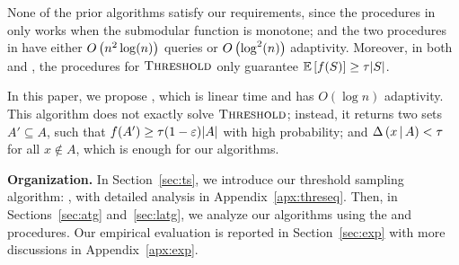 None of the prior algorithms satisfy our
requirements, since
the procedures in  only works when
the submodular function is monotone;
and the two procedures in 
have either $O\left( n^2 \log(n) \right)$ queries or $O\left( \log^2(n) \right)$ adaptivity.
Moreover, in both 
and , the
procedures for $\textsc{Threshold}$ only guarantee
$\mathbb{E} \left[  f(S)  \right] \ge \tau |S|$.

In this paper, we propose 
\threseq, which is linear time and has $O( \log n )$
adaptivity.
This algorithm does not exactly solve $\textsc{Threshold}$; instead,
it returns two sets $A' \subseteq A$, such that
$f(A') \ge \tau(1 - \varepsilon) |A|$ with high probability; 
and $\Delta \left( x \, | \, A \right) < \tau$
for all $x \not \in A$,
which is enough for our algorithms.

\textbf{Organization.}
In Section~\ref{sec:ts}, we introduce our threshold sampling
algorithm: \threseq, with detailed analysis in Appendix~\ref{apx:threseq}.
Then, in Sections~\ref{sec:atg} and~\ref{sec:latg}, 
we analyze our algorithms
using the \threseq and \unc procedures.
Our empirical evaluation is reported in Section~\ref{sec:exp}
with more discussions in Appendix~\ref{apx:exp}.


